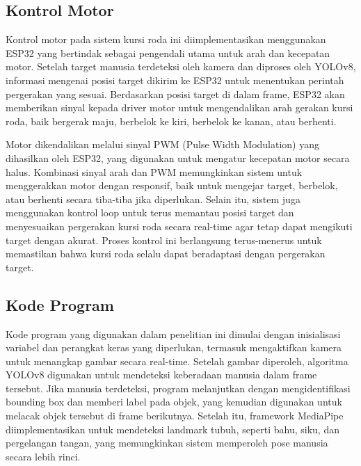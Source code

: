 \subsection{Kontrol Motor}
\label{subsec:kontrol_motor}

Kontrol motor pada sistem kursi roda ini diimplementasikan menggunakan ESP32 yang bertindak sebagai pengendali utama untuk arah dan kecepatan motor. Setelah target manusia terdeteksi oleh kamera dan diproses oleh YOLOv8, informasi mengenai posisi target dikirim ke ESP32 untuk menentukan perintah pergerakan yang sesuai. Berdasarkan posisi target di dalam frame, ESP32 akan memberikan sinyal kepada driver motor untuk mengendalikan arah gerakan kursi roda, baik bergerak maju, berbelok ke kiri, berbelok ke kanan, atau berhenti.

Motor dikendalikan melalui sinyal PWM (Pulse Width Modulation) yang dihasilkan oleh ESP32, yang digunakan untuk mengatur kecepatan motor secara halus. Kombinasi sinyal arah dan PWM memungkinkan sistem untuk menggerakkan motor dengan responsif, baik untuk mengejar target, berbelok, atau berhenti secara tiba-tiba jika diperlukan. Selain itu, sistem juga menggunakan kontrol loop untuk terus memantau posisi target dan menyesuaikan pergerakan kursi roda secara real-time agar tetap dapat mengikuti target dengan akurat. Proses kontrol ini berlangsung terus-menerus untuk memastikan bahwa kursi roda selalu dapat beradaptasi dengan pergerakan target.

\subsection{Kode Program}
\label{subsec:kode_program}

Kode program yang digunakan dalam penelitian ini dimulai dengan inisialisasi variabel dan perangkat keras yang diperlukan, termasuk mengaktifkan kamera untuk menangkap gambar secara real-time. Setelah gambar diperoleh, algoritma YOLOv8 digunakan untuk mendeteksi keberadaan manusia dalam frame tersebut. Jika manusia terdeteksi, program melanjutkan dengan mengidentifikasi bounding box dan memberi label pada objek, yang kemudian digunakan untuk melacak objek tersebut di frame berikutnya. Setelah itu, framework MediaPipe diimplementasikan untuk mendeteksi landmark tubuh, seperti bahu, siku, dan pergelangan tangan, yang memungkinkan sistem memperoleh pose manusia secara lebih rinci.

